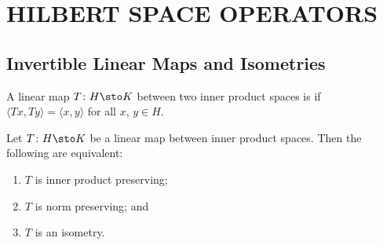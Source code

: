 \chapter{HILBERT SPACE OPERATORS}

\section{Invertible Linear Maps and Isometries}

\begin{defn} A linear map $T\colon H \sto K$ between two inner product spaces is
 if $\langle Tx, Ty \rangle = \langle x, y \rangle$ for all $x$, $y \in H$.
\end{defn}

\begin{prop}\label{prop_isometry_equiv} Let $T\colon H \sto K$ be a linear map between inner product spaces.  Then
the following are equivalent:
 \begin{enumerate}[label=\rm{(\alph*)}]
   \item $T$ is inner product preserving;
   \item $T$ is norm preserving; and
   \item $T$ is an isometry.
 \end{enumerate}
\end{prop}

